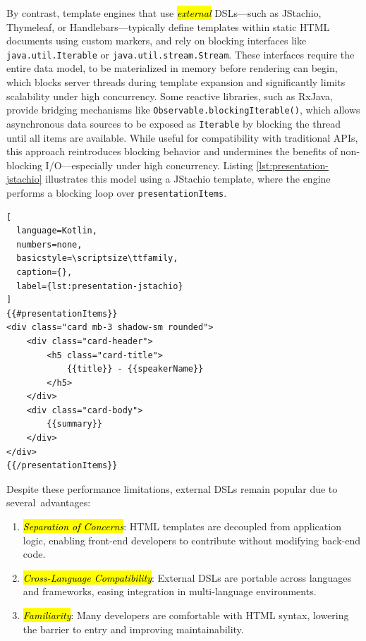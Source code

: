 \documentclass[software,article,accept,pdftex,moreauthors]{Definitions/mdpi}
\begin{document}
By contrast, template engines that use \textit{\hl{external}} DSLs---such as JStachio,
Thymeleaf, or Handlebars---typically define templates within static HTML
documents using custom markers, and rely on blocking interfaces like
\texttt{java.util.Iterable} or \texttt{java.util.stream.Stream}.
These interfaces require the entire data
model, to be materialized in memory before rendering can begin, which blocks server
threads during template expansion and significantly limits scalability under
high concurrency.
Some reactive libraries, such as RxJava, provide bridging mechanisms like
\texttt{Observable.blockingIterable()}, which allows asynchronous data sources
to be exposed as \texttt{Iterable} by blocking the thread until all items are available.
While useful for compatibility with traditional APIs, this approach
reintroduces blocking behavior and undermines the benefits of non-blocking
I/O---especially under high concurrency. Listing \ref{lst:presentation-jstachio}
illustrates this model using a JStachio template, where the engine performs a
blocking loop over \texttt{presentationItems}.

\begin{listing}[H]
\caption{Presentation HTML template using \textit{\hl{JStachio}}.}
\begin{lstlisting}[
  language=Kotlin,
  numbers=none,
  basicstyle=\scriptsize\ttfamily,
  caption={},
  label={lst:presentation-jstachio}
]
{{#presentationItems}}
<div class="card mb-3 shadow-sm rounded">
    <div class="card-header">
        <h5 class="card-title">
            {{title}} - {{speakerName}}
        </h5>
    </div>
    <div class="card-body">
        {{summary}}
    </div>
</div>
{{/presentationItems}}
\end{lstlisting}
\end{listing}

Despite these performance limitations, external DSLs remain popular due to
several~advantages:

\begin{enumerate}
    \item \emph{\hl{Separation of Concerns}}: HTML templates are decoupled from application logic, enabling front-end developers to contribute without modifying back-end code.
    \item \emph{\hl{Cross-Language Compatibility}}: External DSLs are portable across languages and frameworks, easing integration in multi-language environments.
    \item \emph{\hl{Familiarity}}: Many developers are comfortable with HTML syntax, lowering the barrier to entry and improving maintainability.
\end{enumerate}
\end{document}
